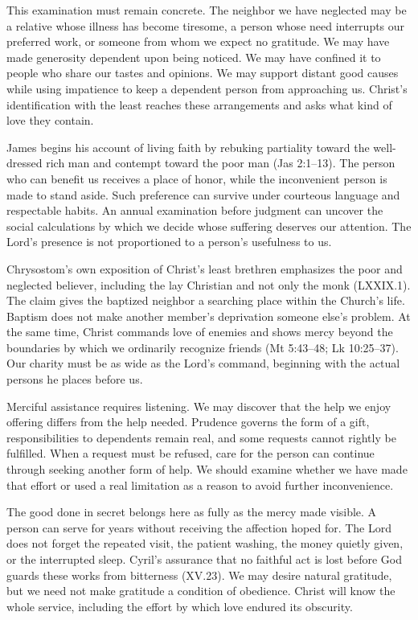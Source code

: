 This examination must remain concrete. The neighbor we have neglected may be a relative whose illness has become tiresome, a person whose need interrupts our preferred work, or someone from whom we expect no gratitude. We may have made generosity dependent upon being noticed. We may have confined it to people who share our tastes and opinions. We may support distant good causes while using impatience to keep a dependent person from approaching us. Christ's identification with the least reaches these arrangements and asks what kind of love they contain.

James begins his account of living faith by rebuking partiality toward the well-dressed rich man and contempt toward the poor man (Jas 2:1--13). The person who can benefit us receives a place of honor, while the inconvenient person is made to stand aside. Such preference can survive under courteous language and respectable habits. An annual examination before judgment can uncover the social calculations by which we decide whose suffering deserves our attention. The Lord's presence is not proportioned to a person's usefulness to us.

Chrysostom's own exposition of Christ's least brethren emphasizes the poor and neglected believer, including the lay Christian and not only the monk (LXXIX.1). The claim gives the baptized neighbor a searching place within the Church's life. Baptism does not make another member's deprivation someone else's problem. At the same time, Christ commands love of enemies and shows mercy beyond the boundaries by which we ordinarily recognize friends (Mt 5:43--48; Lk 10:25--37). Our charity must be as wide as the Lord's command, beginning with the actual persons he places before us.

Merciful assistance requires listening. We may discover that the help we enjoy offering differs from the help needed. Prudence governs the form of a gift, responsibilities to dependents remain real, and some requests cannot rightly be fulfilled. When a request must be refused, care for the person can continue through seeking another form of help. We should examine whether we have made that effort or used a real limitation as a reason to avoid further inconvenience.

The good done in secret belongs here as fully as the mercy made visible. A person can serve for years without receiving the affection hoped for. The Lord does not forget the repeated visit, the patient washing, the money quietly given, or the interrupted sleep. Cyril's assurance that no faithful act is lost before God guards these works from bitterness (XV.23). We may desire natural gratitude, but we need not make gratitude a condition of obedience. Christ will know the whole service, including the effort by which love endured its obscurity.

